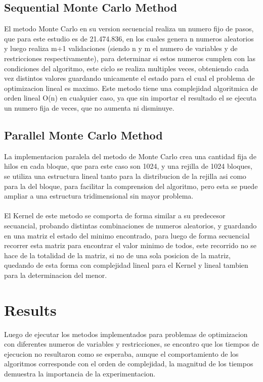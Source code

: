 \documentclass[runningheads]{llncs}
\begin{document}
\subsection{Sequential Monte Carlo Method}
El metodo Monte Carlo en su version secuencial realiza un numero fijo de pasos, que para este estudio es de 21.474.836, en los cuales genera n numeros aleatorios y luego realiza m+1 validaciones (siendo n y m el numero de variables y de restricciones respectivamente), para determinar si estos numeros cumplen con las condiciones del algoritmo, este ciclo se realiza multiples veces, obteniendo cada vez distintos valores guardando unicamente el estado para el cual el problema de optimizacion lineal es maximo.
Este metodo tiene una complejidad algoritmica de orden lineal O(n) en cualquier caso, ya que sin importar el resultado el se ejecuta un numero fija de veces, que no aumenta ni disminuye. 

\subsection{Parallel Monte Carlo Method}
La implementacion paralela del metodo de Monte Carlo crea una cantidad fija de hilos en cada bloque, que para este caso son 1024, y una rejilla de 1024 bloques, se utiliza una estructura lineal tanto para la distribucion de la rejilla asi como para la del bloque, para facilitar la comprension del algoritmo, pero esta se puede ampliar a una estructura tridimensional sin mayor problema.
\paragraph{}
El Kernel de este metodo se comporta de forma similar a su predecesor secuancial, probando distintas combinaciones de numeros aleatorios, y guardando en una matriz el estado del minimo encontrado, para luego de forma secuencial recorrer esta matriz para encontrar el valor minimo de todos, este recorrido no se hace de la totalidad de la matriz, si no de una sola posicion de la matriz, quedando de esta forma con complejidad lineal para el Kernel y lineal tambien para la determinacion del menor.

\section{Results}
Luego de ejecutar los metodos implementados para problemas de optimizacion con diferentes numeros de variables y restricciones, se encontro que los tiempos de ejecucion no resultaron como se esperaba, aunque el comportamiento de los algoritmos corresponde con el orden de complejidad, la magnitud de los tiempos demuestra la importancia de la experimentacion.
\end{document}
